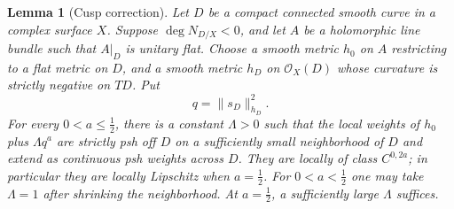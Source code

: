 \documentclass[11pt]{amsart}
\newtheorem{lemma}[theorem]{Lemma}
\theoremstyle{definition}
\theoremstyle{remark}
\numberwithin{equation}{section}
\newcommand{\OO}{\mathcal O}
\begin{document}
\begin{lemma}[Cusp correction]\label{lem:cusp}
Let $D$ be a compact connected smooth curve in a complex surface $X$. Suppose
$\deg N_{D/X}<0$, and let $A$ be a holomorphic line bundle such that
$A|_D$ is unitary flat. Choose a smooth metric $h_0$ on $A$ restricting
to a flat metric on $D$, and a smooth metric $h_D$ on $\OO_X(D)$ whose
curvature is strictly negative on $TD$. Put
\[
 q=\|s_D\|_{h_D}^2.
\]
For every $0<a\le\tfrac12$, there is a constant $\Lambda>0$ such that
the local weights of $h_0$ plus $\Lambda q^a$ are strictly psh off $D$
on a sufficiently small neighborhood of $D$ and extend as continuous
psh weights across $D$. They are locally of class $C^{0,2a}$; in
particular they are locally Lipschitz when $a=\tfrac12$.
For $0<a<\tfrac12$ one may take $\Lambda=1$ after shrinking the
neighborhood. At $a=\tfrac12$, a sufficiently large $\Lambda$ suffices.
\end{lemma}
\end{document}
